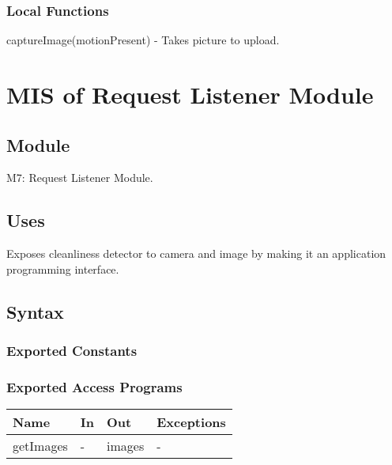\documentclass[12pt, titlepage]{article}
\begin{document}
\subsubsection{Local Functions}

captureImage(motionPresent) - Takes picture to upload.

\newpage

\section{MIS of Request Listener Module} \label{Module} 



\subsection{Module}

M7: Request Listener Module.

\subsection{Uses}
Exposes cleanliness detector to camera and image by making it an application programming interface.

\subsection{Syntax}

\subsubsection{Exported Constants}

\subsubsection{Exported Access Programs}

\begin{center}
\begin{tabular}{p{2cm} p{4cm} p{4cm} p{2cm}}
\hline
\textbf{Name} & \textbf{In} & \textbf{Out} & \textbf{Exceptions} \\
\hline
getImages & - & images & - \\
\hline
\end{tabular}
\end{center}
\end{document}
